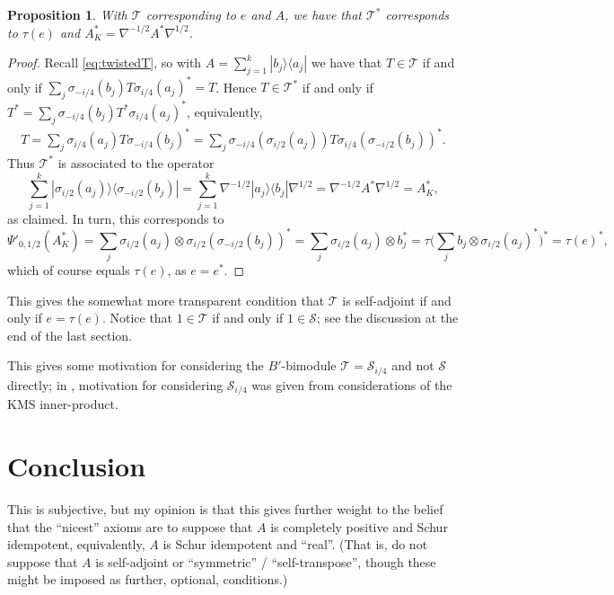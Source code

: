 \documentclass[a4paper,11pt]{article}
\theoremstyle{plain}
\newtheorem{proposition}{Proposition}[section]
\theoremstyle{remark}
\newcommand{\mc}[1]{\mathcal{#1}}
\begin{document}
\begin{proposition}
With $\mc T$ corresponding to $e$ and $A$, we have that $\mc T^*$ corresponds to $\tau(e)$ and $A^*_K = \nabla^{-1/2} A^* \nabla^{1/2}$.
\end{proposition}
\begin{proof}
Recall \eqref{eq:twistedT}, so with $A = \sum_{j=1}^k | b_j \rangle \langle a_j |$ we have that $T\in\mc T$ if and only if $\sum_j \sigma_{-i/4}(b_j) T \sigma_{i/4}(a_j)^* = T$.  Hence $T\in\mc T^*$ if and only if $T^* = \sum_j \sigma_{-i/4}(b_j) T^* \sigma_{i/4}(a_j)^*$, equivalently,
\begin{align*}
T = \sum_j \sigma_{i/4}(a_j) T \sigma_{-i/4}(b_j)^*
= \sum_j \sigma_{-i/4}(\sigma_{i/2}(a_j)) T \sigma_{i/4}(\sigma_{-i/2}(b_j))^*  .
\end{align*}
Thus $\mc T^*$ is associated to the operator
\[ \sum_{j=1}^k | \sigma_{i/2}(a_j) \rangle \langle \sigma_{-i/2}(b_j) |
= \sum_{j=1}^k \nabla^{-1/2} |a_j\rangle \langle b_j| \nabla^{1/2} = \nabla^{-1/2} A^* \nabla^{1/2} = A^*_K, \]
as claimed.  In turn, this corresponds to
\[ \Psi'_{0,1/2}( A^*_K ) = \sum_j \sigma_{i/2}(a_j) \otimes \sigma_{i/2}(\sigma_{-i/2}(b_j))^* =  \sum_j \sigma_{i/2}(a_j) \otimes b_j^*
= \tau \Big( \sum_j b_j \otimes \sigma_{i/2}(a_j)^* \Big)^*
= \tau(e)^*, \]
which of course equals $\tau(e)$, as $e=e^*$.
\end{proof}

This gives the somewhat more transparent condition that $\mc T$ is self-adjoint if and only if $e = \tau(e)$.  Notice that $1\in\mc T$ if and only if $1\in\mc S$; see the discussion at the end of the last section.

This gives some motivation for considering the $B'$-bimodule $\mc T = \mc S_{i/4}$ and not $\mc S$ directly; in \cite{Wasilewski_Quantum_Cayley}, motivation for considering $\mc S_{i/4}$ was given from considerations of the KMS inner-product.




\section{Conclusion}

This is subjective, but my opinion is that this gives further weight to the belief that the ``nicest'' axioms are to suppose that $A$ is completely positive and Schur idempotent, equivalently, $A$ is Schur idempotent and ``real''.  (That is, do not suppose that $A$ is self-adjoint or ``symmetric'' / ``self-transpose'', though these might be imposed as further, optional, conditions.)
\end{document}

